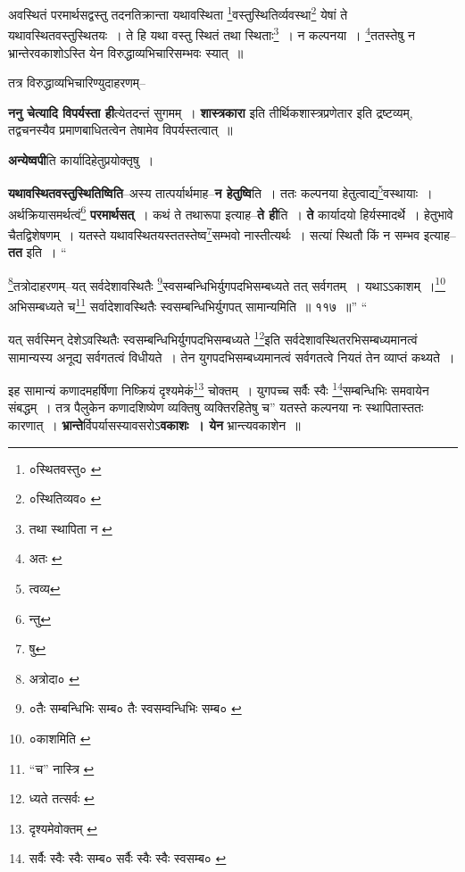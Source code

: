 \documentclass[article,12pt,a4paper]{memoir}
\begin{document}
	  \pstart अवस्थितं परमार्थसद्वस्तु तदनतिक्रान्ता यथावस्थिता \footnote{०स्थितवस्तु० \cite{dp-msC}}\-वस्तुस्थितिर्व्यवस्था\footnote{०स्थितिव्यव० \cite{dp-msA} \cite{dp-msB} \cite{dp-edP} \cite{dp-edH} \cite{dp-edE}} येषां ते यथावस्थितवस्तुस्थितयः । ते हि यथा वस्तु स्थितं तथा स्थिताः\footnote{तथा स्थापिता न \cite{dp-msC} \cite{dp-msD}} । न कल्पनया । \footnote{अतः \cite{dp-msA} \cite{dp-msB} \cite{dp-edP} \cite{dp-edH} \cite{dp-edE} \cite{dp-edN}}\-ततस्तेषु न भ्रान्तेरवकाशोऽस्ति येन विरुद्धाव्यभिचारिसम्भवः स्यात् ॥
	\pend
       

	  \pstart तत्र विरुद्धाव्यभिचारिण्युदाहरणम्--
	\pend
      
	  \endgroup
	

	  \pstart \textbf{ननु चेत्यादि विपर्यस्ता ही}त्येतदन्तं सुगमम् । \textbf{शास्त्रकारा} इति तीर्थिकशास्त्रप्रणेतार इति द्रष्टव्यम्, तद्वचनस्यैव प्रमाणबाधितत्वेन तेषामेव विपर्यस्तत्वात् ॥
	\pend
      

	  \pstart \textbf{अन्येष्वपी}ति कार्यादिहेतुप्रयोक्तृषु ।
	\pend
      

	  \pstart \textbf{यथावस्थितवस्तुस्थितिष्विति}--अस्य तात्पर्यार्थमाह--\textbf{न हेतुष्वि}ति । ततः कल्पनया हेतुत्वाद्य\footnote{त्वव्य}\-वस्थायाः । अर्थक्रियासमर्थत्वं\footnote{न्तु} \textbf{परमार्थसत्} । कथं ते तथारूपा इत्याह--\textbf{ते ही}ति । \textbf{ते} कार्यादयो हिर्यस्मादर्थे । हेतुभावे चैतद्विशेषणम् । यतस्ते यथावस्थितयस्ततस्तेष्व\footnote{षु}\-सम्भवो नास्तीत्यर्थः । सत्यां स्थितौ किं न सम्भव इत्याह--\textbf{तत} इति ।    \leavevmode{} “
	  
	\footnote{अत्रोदा० \cite{dp-edE}}\-तत्रोदाहरणम्--यत् सर्वदेशावस्थितैः \footnote{०तैः सम्बन्धिभिः सम्ब० \cite{dp-msC} तैः स्वसम्वन्धिभिः सम्ब० \cite{dp-msB} \cite{dp-edP} \cite{dp-edH} \cite{dp-edN}}\-स्वसम्बन्धिभिर्युगपदभिसम्बध्यते तत् सर्वगतम् । यथाऽऽकाशम् ।\footnote{०काशमिति \cite{dp-msC}} अभिसम्बध्यते च\footnote{“च” नास्त्रि \cite{dp-msB} \cite{dp-edP} \cite{dp-edH} \cite{dp-edE}} सर्वादेशावस्थितैः स्वसम्बन्धिभिर्युगपत् सामान्यमिति ॥ ११७ ॥” “
	  
	यत् सर्वस्मिन् देशेऽवस्थितैः स्वसम्बन्धिभिर्युगपदभिसम्बध्यते \footnote{ध्यते तत्सर्वः \cite{dp-msA} \cite{dp-msB} \cite{dp-edP} \cite{dp-edH} \cite{dp-edE} \cite{dp-edN}}\-इति सर्वदेशावस्थितरभिसम्बध्यमानत्वं सामान्यस्य अनूद्य सर्वगतत्वं विधीयते । तेन युगपदभिसम्बध्यमानत्वं सर्वगतत्वे नियतं तेन व्याप्तं कथ्यते । 
	  
	इह सामान्यं कणादमहर्षिणा निष्क्रियं दृश्यमेकं\footnote{दृश्यमेवोक्तम् \cite{dp-msB}} चोक्तम् । युगपच्च सर्वैः स्वैः \footnote{सर्वैः स्वैः स्वैः सम्ब० \cite{dp-msA} \cite{dp-edP} \cite{dp-edH} \cite{dp-edE} \cite{dp-edN} सर्वैः स्वैः स्वैः स्वसम्ब० \cite{dp-msB}}\-सम्बन्धिभिः समवायेन संबद्धम् । तत्र पैलुकेन कणादशिष्येण व्यक्तिषु व्यक्तिरहितेषु च” यतस्ते कल्पनया नः स्थापितास्ततः कारणात् । \textbf{भ्रान्ते}र्विपर्यासस्यावसरोऽ\textbf{वकाशः । येन} भ्रान्त्यवकाशेन ॥
	\pend
      
\end{document}
